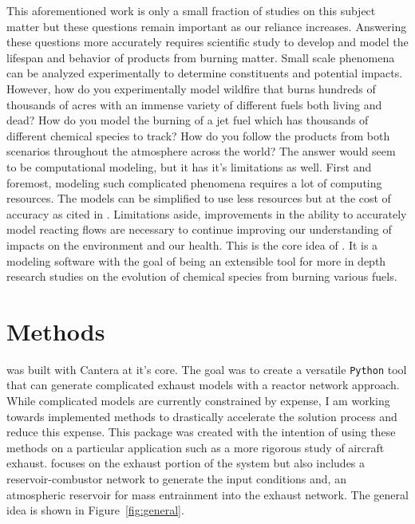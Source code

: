 \documentclass[smallextended,referee]{svjour3}
\begin{document}
This aforementioned work is only a small fraction of studies on this subject matter but these questions remain important as our reliance increases. Answering these questions more accurately requires scientific study to develop and model the lifespan and behavior of products from burning matter. Small scale phenomena can be analyzed experimentally to determine constituents and potential impacts. However, how do you experimentally model wildfire that burns hundreds of thousands of acres with an immense variety of different fuels both living and dead? How do you model the burning of a jet fuel which has thousands of different chemical species to track? How do you follow the products from both scenarios throughout the atmosphere across the world? The answer would seem to be computational modeling, but it has it's limitations as well. First and foremost, modeling such complicated phenomena requires a lot of computing resources. The models can be simplified to use less resources but at the cost of accuracy \cite{Christian2018GlobalCampaigns} as cited in \cite{Kelp2018Orders-of-magnitudeEmulation}.
Limitations aside, improvements in the ability to accurately model reacting flows are necessary to continue improving our understanding of impacts on the environment and our health. This is the core idea of \pyplume{}. It is a modeling software with the goal of being an extensible tool for more in depth research studies on the evolution of chemical species from burning various fuels.



 







\section{Methods}

\pyplume{} was built with Cantera\cite{cantera} at it's core. The goal was to create a versatile \texttt{Python} tool that can generate complicated exhaust models with a reactor network approach. While complicated models are currently constrained by expense, I am working towards implemented methods to drastically accelerate the solution process and reduce this expense. This package was created with the intention of using these methods on a particular application such as a more rigorous study of aircraft exhaust. \pyplume{} focuses on the exhaust portion of the system but also includes a reservoir-combustor network to generate the input conditions and, an atmospheric reservoir for mass entrainment into the exhaust network. The general idea is shown in Figure~\ref{fig:general}.
\end{document}

